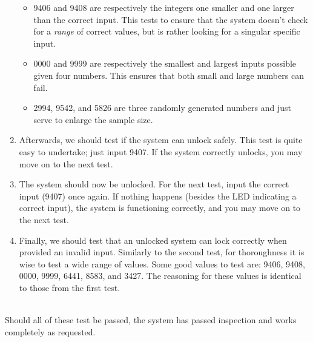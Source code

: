 \documentclass[10pt,a4paper]{article}
\begin{document}
\begin{enumerate}
\begin{itemize}
			\item 9406 and 9408 are respectively the integers one smaller and one larger than the correct input. This tests to ensure that the system doesn't check for a \textit{range} of correct values, but is rather looking for a singular specific input. 
			\item 0000 and 9999 are respectively the smallest and largest inputs possible given four numbers. This ensures that both small and large numbers can fail.
			\item 2994, 9542, and 5826 are three randomly generated numbers and just serve to enlarge the sample size.
		\end{itemize}
		\item Afterwards, we should test if the system can unlock safely. This test is quite easy to undertake; just input 9407. If the system correctly unlocks, you may move on to the next test. 
		\item The system should now be unlocked. For the next test, input the correct input (9407) once again. If nothing happens (besides the LED indicating a correct input), the system is functioning correctly, and you may move on to the next test.
		\item Finally, we should test that an unlocked system can lock correctly when provided an invalid input. Similarly to the second test, for thoroughness it is wise to test a wide range of values. Some good values to test are: 9406, 9408, 0000, 9999, 6441, 8583, and 3427. The reasoning for these values is identical to those from the first test. 
	\end{enumerate}~\\
	Should all of these test be passed, the system has passed inspection and works completely as requested.
\end{document}
